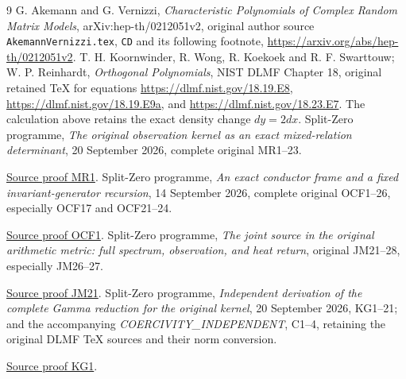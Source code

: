 \documentclass[11pt]{article}
\begin{document}
\begin{thebibliography}{9}
 G. Akemann and G. Vernizzi,
\emph{Characteristic Polynomials of Complex Random Matrix Models},
arXiv:hep-th/0212051v2, original author source
\texttt{AkemannVernizzi.tex}, \texttt{CD} and its following footnote,
\url{https://arxiv.org/abs/hep-th/0212051v2}.
 T. H. Koornwinder, R. Wong, R. Koekoek and R. F. Swarttouw;
W. P. Reinhardt, \emph{Orthogonal Polynomials}, NIST DLMF Chapter 18,
original retained TeX for equations
\url{https://dlmf.nist.gov/18.19.E8},
\url{https://dlmf.nist.gov/18.19.E9a}, and
\url{https://dlmf.nist.gov/18.23.E7}.
The calculation above retains the exact density change \(dy=2dx\).
 Split-Zero programme,
\emph{The original observation kernel as an exact mixed-relation
determinant}, 20 September 2026, complete original MR1--23.

\href{https://github.com/KokunoYumeto/zeta-function-research-reader/blob/5992ad50c0f2a06921f1fcaded7b4e38097c0739/workbenches/splitzero-tandem/continuations/20260920-original-kernel-mixed-determinants/ORIGINAL_KERNEL_MIXED_DETERMINANT.tex\#L36}{Source proof MR1}.
 Split-Zero programme,
\emph{An exact conductor frame and a fixed invariant-generator
recursion}, 14 September 2026, complete original OCF1--26,
especially OCF17 and OCF21--24.

\href{https://github.com/KokunoYumeto/zeta-function-research-reader/blob/5992ad50c0f2a06921f1fcaded7b4e38097c0739/workbenches/splitzero-tandem/continuations/20260920-original-kernel-mixed-determinants/providers/ORIGINAL_CONDUCTOR_STRIP_FRAME.tex\#L27}{Source proof OCF1}.
 Split-Zero programme,
\emph{The joint source in the original arithmetic metric: full
spectrum, observation, and heat return}, original JM21--28,
especially JM26--27.

\href{https://github.com/KokunoYumeto/zeta-function-research-reader/blob/5992ad50c0f2a06921f1fcaded7b4e38097c0739/workbenches/splitzero-tandem/continuations/20260920-original-kernel-mixed-determinants/providers/JOINT_MINIMUM_RECEIVERS.tex\#L286}{Source proof JM21}.
 Split-Zero programme,
\emph{Independent derivation of the complete Gamma reduction for the
original kernel}, 20 September 2026, KG1--21; and the accompanying
\emph{COERCIVITY\_INDEPENDENT}, C1--4, retaining the original DLMF
TeX sources and their norm conversion.

\href{https://github.com/KokunoYumeto/zeta-function-research-reader/blob/5992ad50c0f2a06921f1fcaded7b4e38097c0739/workbenches/splitzero-tandem/continuations/20260920-original-kernel-mixed-determinants/providers/KERNEL_GAMMA_INDEPENDENT.tex\#L73}{Source proof KG1}.
\end{thebibliography}
\end{document}

